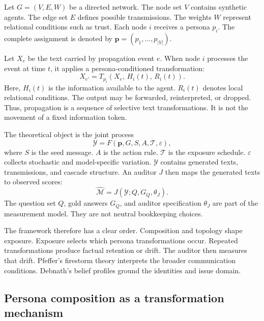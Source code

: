 Let \(G=(V,E,W)\) be a directed network.
The node set \(V\) contains synthetic agents.
The edge set \(E\) defines possible transmissions.
The weights \(W\) represent relational conditions such as trust.
Each node \(i\) receives a persona \(p_i\).
The complete assignment is denoted by \(\boldsymbol{p}=(p_1,\ldots,p_{|V|})\).

Let \(X_e\) be the text carried by propagation event \(e\).
When node \(i\) processes the event at time \(t\), it applies a persona-conditioned transformation:
\begin{equation}
X_{e'} = T_{p_i}\!\left(X_e,\,H_i(t),\,R_i(t)\right).
\label{eq:persona-transform}
\end{equation}
Here, \(H_i(t)\) is the information available to the agent.
\(R_i(t)\) denotes local relational conditions.
The output may be forwarded, reinterpreted, or dropped.
Thus, propagation is a sequence of selective text transformations.
It is not the movement of a fixed information token.

The theoretical object is the joint process
\begin{equation}
\mathcal{Y}
=
F\!\left(
\boldsymbol{p},
G,
S,
A,
\mathcal{T},
\varepsilon
\right),
\label{eq:joint-process}
\end{equation}
where \(S\) is the seed message.
\(A\) is the action rule.
\(\mathcal{T}\) is the exposure schedule.
\(\varepsilon\) collects stochastic and model-specific variation.
\(\mathcal{Y}\) contains generated texts, transmissions, and cascade structure.
An auditor \(J\) then maps the generated texts to observed scores:
\begin{equation}
\widehat{\mathcal{M}} = J(\mathcal{Y};Q,G_Q,\theta_J).
\label{eq:measurement-map}
\end{equation}
The question set \(Q\), gold answers \(G_Q\), and auditor specification \(\theta_J\) are part of the measurement model.
They are not neutral bookkeeping choices.

The framework therefore has a clear order.
Composition and topology shape exposure.
Exposure selects which persona transformations occur.
Repeated transformations produce factual retention or drift.
The auditor then measures that drift.
Pfeffer's firestorm theory interprets the broader communication conditions.
Debnath's belief profiles ground the identities and issue domain.

\subsection{Persona composition as a transformation mechanism}
\label{subsec:persona-composition}

